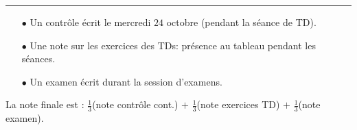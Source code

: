 \documentclass[12pt,a4paper]{article}
\begin{document}
\begin{enumerate}
\end{enumerate}

\bigskip
\hrule
{}
\begin{itemize}
\item[$\bullet$] Un contr\^ole \'ecrit le mercredi $24$ octobre (pendant la s\'eance de TD). 
\item[$\bullet$] Une note sur les exercices des TDs: pr\'esence au
  tableau pendant les s\'eances.
\item[$\bullet$] Un examen \'ecrit durant la session d'examens. 
\end{itemize}
La note finale est : $\frac{1}{3}$(note contr\^ole cont.) $+$
$\frac{1}{3}$(note exercices TD) $+$
$\frac{1}{3}$(note examen).
\end{document}
